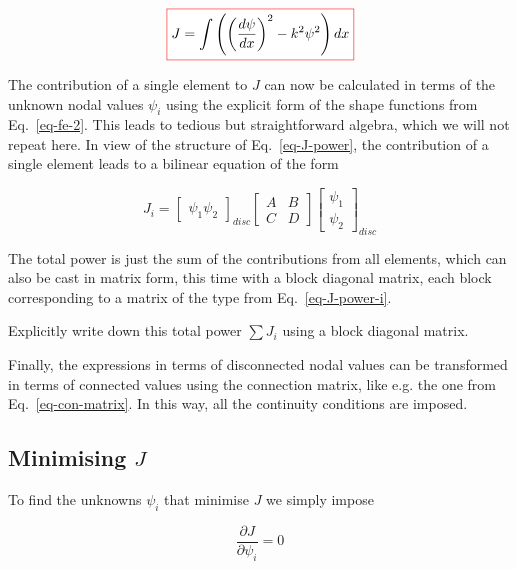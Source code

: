 \begin{equation}
\fbox{$\displaystyle
J = \int \left( \left(\frac{d \psi}{d x}\right)^2 - k^2 \psi^2 \right) dx \label{eq-J-power}
$}
\end{equation} 

The contribution of a single element to $J$ can now be calculated in terms of the unknown nodal values $\psi_i$ using the explicit form of the shape functions from Eq.~\ref{eq-fe-2}. This leads to tedious but straightforward algebra, which we will not repeat here. In view of the structure of Eq.~\ref{eq-J-power}, the contribution of a single element leads to a bilinear equation of the form

\begin{equation}
J_i = \begin{bmatrix}
\psi_1 \psi_2 
\end{bmatrix}_{disc}
\begin{bmatrix}
A & B \\
C & D 
\end{bmatrix}
\begin{bmatrix}
\psi_1 \\ \psi_2
\end{bmatrix}_{disc}
\label{eq-J-power-i}
\end{equation} 

The total power is just the sum of the contributions from all elements, which can also be cast in matrix form, this time with a block diagonal matrix, each block corresponding to a matrix of the type from Eq.~\ref{eq-J-power-i}.

\begin{exer}
Explicitly write down this total power $\sum J_i$ using a block diagonal matrix.
\end{exer}

Finally, the expressions in terms of disconnected nodal values can be transformed in terms of connected values using the connection matrix, like e.g. the one from Eq.~\ref{eq-con-matrix}. In this way, all the continuity conditions are imposed.

\subsection{Minimising $J$}

To find the unknowns $\psi_i$ that minimise $J$ we simply impose

\begin{equation}
\frac{\partial J}{\partial \psi_i} = 0 \label{eq-rayleigh-ritz}
\end{equation} 

